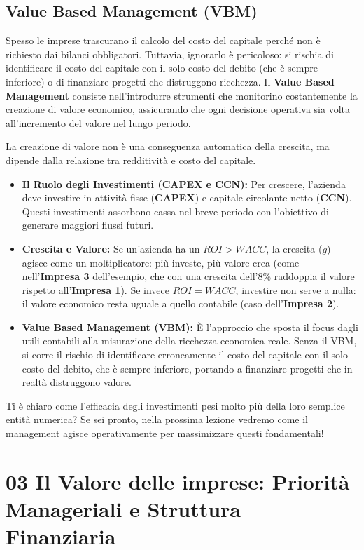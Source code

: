 \documentclass[a4paper,10pt]{article}
\begin{document}
\subsection*{Value Based Management (VBM)}

Spesso le imprese trascurano il calcolo del costo del capitale perché non è richiesto dai bilanci obbligatori. Tuttavia, ignorarlo è pericoloso: si rischia di identificare il costo del capitale con il solo costo del debito (che è sempre inferiore) o di finanziare progetti che distruggono ricchezza. Il \textbf{Value Based Management} consiste nell'introdurre strumenti che monitorino costantemente la creazione di valore economico, assicurando che ogni decisione operativa sia volta all'incremento del valore nel lungo periodo.

La creazione di valore non è una conseguenza automatica della crescita, ma dipende dalla relazione tra redditività e costo del capitale.

\begin{itemize}
    \item \textbf{Il Ruolo degli Investimenti (CAPEX e CCN):} Per crescere, l'azienda deve investire in attività fisse (\textbf{CAPEX}) e capitale circolante netto (\textbf{CCN}). Questi investimenti assorbono cassa nel breve periodo con l'obiettivo di generare maggiori flussi futuri.
    \item \textbf{Crescita e Valore:} Se un'azienda ha un $ROI > WACC$, la crescita ($g$) agisce come un moltiplicatore: più investe, più valore crea (come nell'\textbf{Impresa 3} dell'esempio, che con una crescita dell'8\% raddoppia il valore rispetto all'\textbf{Impresa 1}). Se invece $ROI = WACC$, investire non serve a nulla: il valore economico resta uguale a quello contabile (caso dell'\textbf{Impresa 2}).
    \item \textbf{Value Based Management (VBM):} È l'approccio che sposta il focus dagli utili contabili alla misurazione della ricchezza economica reale. Senza il VBM, si corre il rischio di identificare erroneamente il costo del capitale con il solo costo del debito, che è sempre inferiore, portando a finanziare progetti che in realtà distruggono valore.
\end{itemize}

Ti è chiaro come l'efficacia degli investimenti pesi molto più della loro semplice entità numerica? Se sei pronto, nella prossima lezione vedremo come il management agisce operativamente per massimizzare questi fondamentali!
\section*{03 Il Valore delle imprese: Priorità Manageriali e Struttura Finanziaria}
\end{document}
